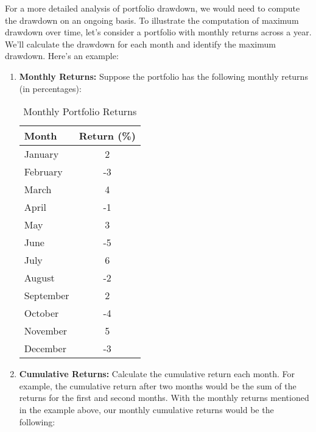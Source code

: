 \documentclass{article}
\begin{document}
For a more detailed analysis of portfolio drawdown, we would need to compute the drawdown on an ongoing basis. To illustrate the computation of maximum drawdown over time, let's consider a portfolio with monthly returns across a year. We'll calculate the drawdown for each month and identify the maximum drawdown. Here's an example:

\begin{enumerate}
    \item \textbf{Monthly Returns:} Suppose the portfolio has the following monthly returns (in percentages): \\ 

    \begin{table}[H]
    \centering
    \begin{tabular}{|l|c|}
    \hline
    \textbf{Month} & \textbf{Return (\%)} \\ \hline
    January        & 2                    \\ \hline
    February       & -3                   \\ \hline
    March          & 4                    \\ \hline
    April          & -1                   \\ \hline
    May            & 3                    \\ \hline
    June           & -5                   \\ \hline
    July           & 6                    \\ \hline
    August         & -2                   \\ \hline
    September      & 2                    \\ \hline
    October        & -4                   \\ \hline
    November       & 5                    \\ \hline
    December       & -3                   \\ \hline
    \end{tabular}
    \caption{Monthly Portfolio Returns}
    \label{table:monthly-returns}
    \end{table}



    \item \textbf{Cumulative Returns:} Calculate the cumulative return each month. For example, the cumulative return after two months would be the sum of the returns for the first and second months. With the monthly returns mentioned in the example above, our monthly cumulative returns would be the following: \\
    

\end{enumerate}
\end{document}
